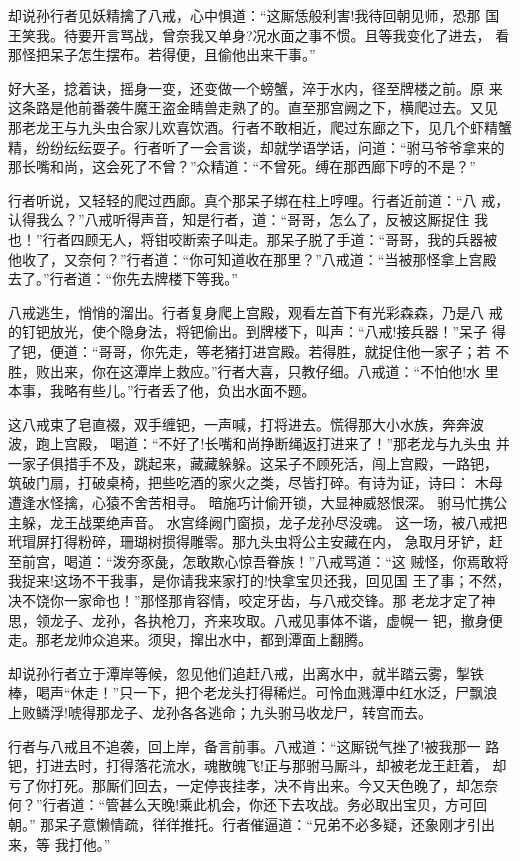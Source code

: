 却说孙行者见妖精擒了八戒，心中惧道：“这厮恁般利害!我待回朝见师，恐那
国王笑我。待要开言骂战，曾奈我又单身?况水面之事不惯。且等我变化了进去，
看那怪把呆子怎生摆布。若得便，且偷他出来干事。”

好大圣，捻着诀，摇身一变，还变做一个螃蟹，淬于水内，径至牌楼之前。原
来这条路是他前番袭牛魔王盗金睛兽走熟了的。直至那宫阙之下，横爬过去。又见
那老龙王与九头虫合家儿欢喜饮酒。行者不敢相近，爬过东廊之下，见几个虾精蟹
精，纷纷纭纭耍子。行者听了一会言谈，却就学语学话，问道：“驸马爷爷拿来的
那长嘴和尚，这会死了不曾？”众精道：“不曾死。缚在那西廊下哼的不是？”

行者听说，又轻轻的爬过西廊。真个那呆子绑在柱上哼哩。行者近前道：“八
戒，认得我么？”八戒听得声音，知是行者，道：“哥哥，怎么了，反被这厮捉住
我也！”行者四顾无人，将钳咬断索子叫走。那呆子脱了手道：“哥哥，我的兵器被
他收了，又奈何？”行者道：“你可知道收在那里？”八戒道：“当被那怪拿上宫殿
去了。”行者道：“你先去牌楼下等我。”

八戒逃生，悄悄的溜出。行者复身爬上宫殿，观看左首下有光彩森森，乃是八
戒的钉钯放光，使个隐身法，将钯偷出。到牌楼下，叫声：“八戒!接兵器！”呆子
得了钯，便道：“哥哥，你先走，等老猪打进宫殿。若得胜，就捉住他一家子；若
不胜，败出来，你在这潭岸上救应。”行者大喜，只教仔细。八戒道：“不怕他!水
里本事，我略有些儿。”行者丢了他，负出水面不题。

这八戒束了皂直裰，双手缠钯，一声喊，打将进去。慌得那大小水族，奔奔波
波，跑上宫殿，喝道：“不好了!长嘴和尚挣断绳返打进来了！”那老龙与九头虫
并一家子俱措手不及，跳起来，藏藏躲躲。这呆子不顾死活，闯上宫殿，一路钯，
筑破门扇，打破桌椅，把些吃酒的家火之类，尽皆打碎。有诗为证，诗曰：
木母遭逢水怪擒，心猿不舍苦相寻。
暗施巧计偷开锁，大显神威怒恨深。
驸马忙携公主躲，龙王战栗绝声音。
水宫绛阙门窗损，龙子龙孙尽没魂。
这一场，被八戒把玳瑁屏打得粉碎，珊瑚树掼得雕零。那九头虫将公主安藏在内，
急取月牙铲，赶至前宫，喝道：“泼夯豕彘，怎敢欺心惊吾眷族！”八戒骂道：“这
贼怪，你焉敢将我捉来!这场不干我事，是你请我来家打的!快拿宝贝还我，回见国
王了事；不然，决不饶你一家命也！”那怪那肯容情，咬定牙齿，与八戒交锋。那
老龙才定了神思，领龙子、龙孙，各执枪刀，齐来攻取。八戒见事体不谐，虚幌一
钯，撤身便走。那老龙帅众追来。须臾，撺出水中，都到潭面上翻腾。

却说孙行者立于潭岸等候，忽见他们追赶八戒，出离水中，就半踏云雾，掣铁
棒，喝声“休走！”只一下，把个老龙头打得稀烂。可怜血溅潭中红水泛，尸飘浪
上败鳞浮!唬得那龙子、龙孙各各逃命；九头驸马收龙尸，转宫而去。

行者与八戒且不追袭，回上岸，备言前事。八戒道：“这厮锐气挫了!被我那一
路钯，打进去时，打得落花流水，魂散魄飞!正与那驸马厮斗，却被老龙王赶着，
却亏了你打死。那厮们回去，一定停丧挂孝，决不肯出来。今又天色晚了，却怎奈
何？”行者道：“管甚么天晚!乘此机会，你还下去攻战。务必取出宝贝，方可回朝。”
那呆子意懒情疏，徉徉推托。行者催逼道：“兄弟不必多疑，还象刚才引出来，等
我打他。”

